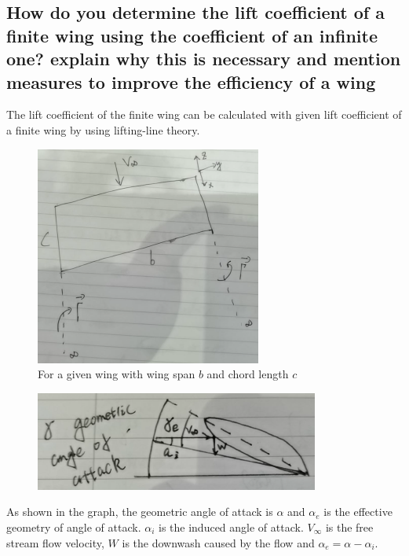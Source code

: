 \documentclass[11pt]{article}
\numberwithin{equation}{section}
\begin{document}
\subsection{How do you determine the lift coefficient of a finite wing using the coefficient of an infinite one? explain why this is necessary and mention measures to improve the efficiency of a wing}
The lift coefficient of the finite wing can be calculated with given lift coefficient of a finite wing by using lifting-line theory.
\begin{figure}[H]
  \centering
  \includegraphics[width = 0.35 \textwidth]{./img/diagram3.png}
  \caption{For a given wing with wing span $b$ and chord length $c$}
\end{figure}
\begin{figure}[H]
  \centering
  \includegraphics[width = 0.5 \textwidth]{./img/diagram4.png}
  \caption{}
  \label{GeometricAngleOfAttack}
\end{figure}
As shown in the graph, the geometric angle of attack is $\alpha$ and $\alpha_e$ is the effective geometry of angle of attack. $\alpha_i$ is the induced angle of attack. $V_{\infty}$ is the free stream flow velocity, $W$ is the downwash caused by the flow and $\alpha_e = \alpha - \alpha_i$. 
\end{document}
